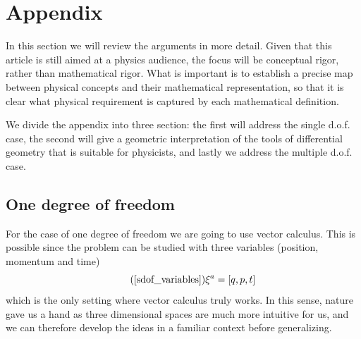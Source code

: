 \documentclass[10pt,twocolumn, nofootinbib]{revtex4-2}
\begin{document}



\section*{Appendix}

In this section we will review the arguments in more detail. Given that this article is still aimed at a physics audience, the focus will be conceptual rigor, rather than mathematical rigor. What is important is to establish a precise map between physical concepts and their mathematical representation, so that it is clear what physical requirement is captured by each mathematical definition.

We divide the appendix into three section: the first will address the single d.o.f. case, the second will give a geometric interpretation of the tools of differential geometry that is suitable for physicists, and lastly we address the multiple d.o.f. case.

\subsection*{One degree of freedom}

For the case of one degree of freedom we are going to use vector calculus. This is possible since the problem can be studied with three variables (position, momentum and time)
\begin{equation}
\tag*{(\ref{sdof_variables})}
	\xi^a = [ q, p, t]
\end{equation}
which is the only setting where vector calculus truly works. In this sense, nature gave us a hand as three dimensional spaces are much more intuitive for us, and we can therefore develop the ideas in a familiar context before generalizing.
\end{document}
